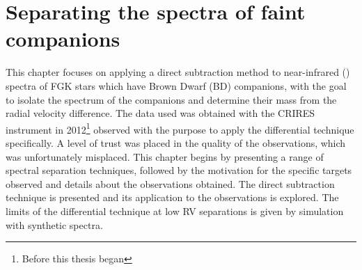 
\chapter{Separating the spectra of faint companions} %
\label{cha:direct_recovery}

This chapter focuses on applying a direct subtraction method to near-infrared (\nir{}) spectra of {FGK} stars which have Brown Dwarf (BD) companions, with the goal to isolate the spectrum of the companions and determine their mass from the radial velocity difference.
The data used was obtained with the {CRIRES} instrument in 2012\footnote{Before this thesis began} observed with the purpose to apply the differential technique specifically.
A level of trust was placed in the quality of the observations, which was unfortunately misplaced.
This chapter begins by presenting a range of spectral separation techniques, followed by the motivation for the specific targets observed and details about the observations obtained.
The direct subtraction technique is presented and its application to the observations is explored.
The limits of the differential technique at low {RV} separations is given by simulation with synthetic spectra.
























